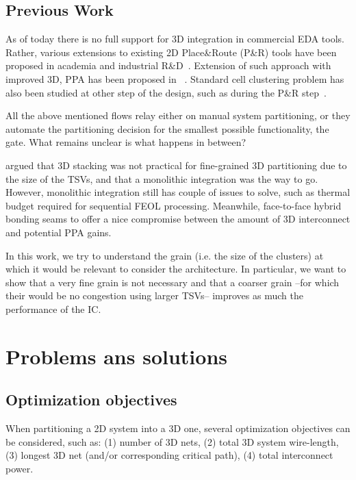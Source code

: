 \documentclass[conference]{IEEEtran}
\begin{document}

\subsection{Previous Work}
As of today there is no full support for 3D integration in commercial EDA tools. Rather, various extensions to existing 2D Place\&Route (P\&R) tools have been proposed in academia and industrial R\&D~\cite{Panth}. %
Extension of such approach with improved 3D, PPA has been proposed in ~\cite{Chang2016}. %
Standard cell clustering problem has also been studied at other step of the design, such as during the P\&R step~\cite{Moura2017}. %

All the above mentioned flows relay either on manual system partitioning, or they automate the partitioning decision for the smallest possible functionality, the gate. What remains unclear is what happens in between?  

\cite{Samal2017} argued that 3D stacking was not practical for fine-grained 3D partitioning due to the size of the TSVs, and that a monolithic integration was the way to go. However, monolithic integration still has couple of issues to solve, such as thermal budget required for sequential FEOL processing. Meanwhile, face-to-face hybrid bonding seams to offer a nice compromise between the amount of 3D interconnect and potential PPA gains.

In this work, we try to understand the grain (i.e. the size of the clusters) at which it would be relevant to consider the architecture.
In particular, we want to show that a very fine grain is not necessary and that a coarser grain --for which their would be no congestion using larger TSVs-- improves as much the performance of the IC.

\section{Problems ans solutions}
\subsection{Optimization objectives}
When partitioning a 2D system into a 3D one, several optimization objectives can be considered, such as: (1) number of 3D nets, (2) total 3D system wire-length, (3) longest 3D net (and/or corresponding critical path), (4) total interconnect power.
\end{document}

